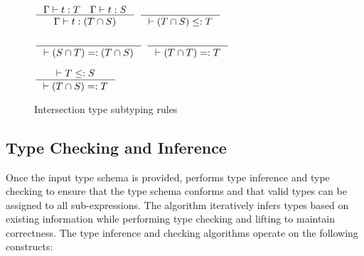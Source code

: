 \documentclass[acmsmall,nonacm]{acmart}\settopmatter{printfolios=true,printccs=false,printacmref=false}
\newcommand{\rhyme}{\text{Rhyme}\xspace}
\begin{document}
\begin{minipage}{0.5\textwidth}
\begin{figure}[H]
  \centering
\vspace*{5mm}
$\inference {\Gamma |- t : T \quad \Gamma |- t : S}{\Gamma |- t : (T \cap S)}$\hspace*{2mm}
$\inference {}{|- (T \cap S) \leq: T}$\par
\vspace*{4mm}
$\inference {}{|- (S \cap T) =: (T \cap S)}$\hspace*{2mm}
$\inference {}{|- (T \cap T) =: T}$\par
\vspace*{4mm}
$\inference {|- T \leq: S}{|- (T \cap S) =: T}$
\caption*{Intersection type subtyping rules}
\end{figure}
\end{minipage}

\subsection{Type Checking and Inference} Once the input type schema is provided, \rhyme performs type inference and type checking to ensure that the type schema conforms and that valid types can be assigned to all sub-expressions. The algorithm iteratively infers types based on existing information while performing type checking and lifting to maintain correctness. The type inference and checking algorithms operate on the following constructs:
\end{document}
